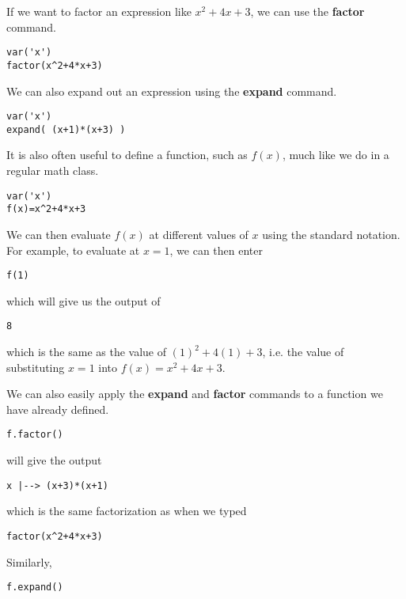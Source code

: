 \documentclass[12pt]{amsart}
\theoremstyle{definition}
\theoremstyle{definition}
\begin{document}
If we want to factor an expression like $x^2+4x+3$, we can use
the  \textbf{factor} command.

\begin{verbatim}
var('x')
factor(x^2+4*x+3)
\end{verbatim}

We can also expand out an expression using the \textbf{expand} command.

\begin{verbatim}
var('x')
expand( (x+1)*(x+3) )
\end{verbatim}

It is also often useful to define a function, such as $f(x)$, much like
we do in a regular math class.

\begin{verbatim}
var('x')
f(x)=x^2+4*x+3
\end{verbatim}

We can then evaluate $f(x)$ at different values of $x$ using the standard
notation. For example, to evaluate at $x=1$, we can then enter

\begin{verbatim}
f(1)
\end{verbatim}

which will give us the output of

\begin{verbatim}
8
\end{verbatim}

which is the same as the value of $(1)^2+4(1)+3$, i.e. the value of
substituting $x=1$ into $f(x)=x^2+4x+3$.

We can also easily apply the \textbf{expand} and \textbf{factor}
commands to a function we have already defined.

\begin{verbatim}
f.factor()
\end{verbatim}

will give the output

\begin{verbatim}
x |--> (x+3)*(x+1)
\end{verbatim}

which is the same factorization as when we typed

\begin{verbatim}
factor(x^2+4*x+3)
\end{verbatim}

Similarly,

\begin{verbatim}
f.expand()
\end{verbatim}
\end{document}
